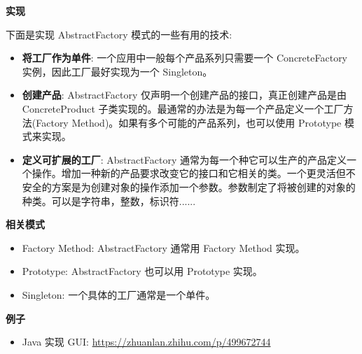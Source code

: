 \noindent\textbf{实现}

下面是实现 AbstractFactory 模式的一些有用的技术:
\begin{itemize}
    \item \textbf{将工厂作为单件}: 一个应用中一般每个产品系列只需要一个 ConcreteFactory 实例，因此工厂最好实现为一个 Singleton。
    \item \textbf{创建产品}: AbstractFactory 仅声明一个创建产品的接口，真正创建产品是由 ConcreteProduct 子类实现的。最通常的办法是为每一个产品定义一个工厂方法(Factory Method)。如果有多个可能的产品系列，也可以使用 Prototype 模式来实现。
    \item \textbf{定义可扩展的工厂}: AbstractFactory 通常为每一个种它可以生产的产品定义一个操作。增加一种新的产品要求改变它的接口和它相关的类。一个更灵活但不安全的方案是为创建对象的操作添加一个参数。参数制定了将被创建的对象的种类。可以是字符串，整数，标识符......
\end{itemize}

\noindent\textbf{相关模式}
\begin{itemize}
    \item Factory Method: AbstractFactory 通常用 Factory Method 实现。
    \item Prototype: AbstractFactory 也可以用 Prototype 实现。
    \item Singleton: 一个具体的工厂通常是一个单件。
\end{itemize}

\noindent\textbf{例子}

\begin{itemize}
    \item Java 实现 GUI: \url{https://zhuanlan.zhihu.com/p/499672744}
\end{itemize}



\newpage